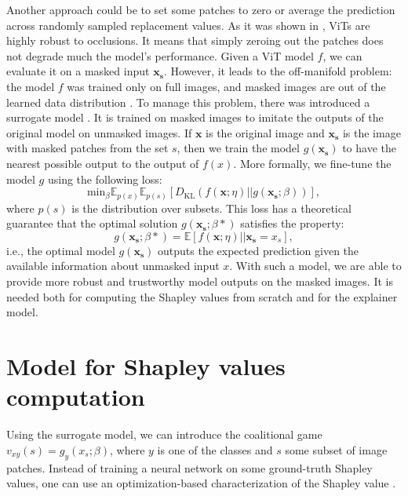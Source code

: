 \documentclass[en]{pracamgr}
\begin{document}
Another approach could be to set some patches to zero or average the prediction across randomly sampled replacement values. As it was shown in \cite{DBLP:conf/nips/NaseerRKHKY21}, ViTs are highly robust to occlusions. It means that simply zeroing out the patches does not degrade much the model's performance.  Given a ViT model $f$, we can evaluate it on a masked input $\mathbf{x_s}$. However, it leads to the off-manifold problem: the model $f$ was trained only on full images, and masked images are out of the learned data distribution \cite{DBLP:conf/aistats/TaufiqBM23}.  To manage this problem, there was introduced a surrogate model \cite{DBLP:conf/iclr/FryeMBCSF21}. It is trained on masked images to imitate the outputs of the original model on unmasked images. If $\mathbf{x}$ is the original image and $\mathbf{x_s}$ is the image with masked patches from the set $s$, then we train the model $g(\mathbf{x_s})$ to have the nearest possible output to the output of $f(x)$. More formally, we fine-tune the model $g$ using the following loss:
\begin{equation*}
    \textrm{min}_{\beta} \mathbb{E}_{p(x)} \mathbb{E}_{p(s)} \left[D_{\textrm{KL}} \left(f(\mathbf{x};\eta) || g(\mathbf{x_s};\beta)\right)\right],
\end{equation*}
where $p(s)$ is the distribution over subsets. This loss has a theoretical guarantee that the optimal solution $g(\mathbf{x_s};\beta*)$ satisfies the property:
\begin{equation*}
    g(\mathbf{x_s};\beta*) = \mathbb{E}\left[f(\mathbf{x};\eta) || \mathbf{x_s}=x_s \right],
\end{equation*}
i.e., the optimal model $g(\mathbf{x_s})$ outputs the expected prediction given the available information about unmasked input $x$. With such a model, we are able to provide more robust and trustworthy model outputs on the masked images. It is needed both for computing the Shapley values from scratch and for the explainer model.

\section{Model for Shapley values computation}\label{s:explainer_model}
Using the surrogate model, we can introduce the coalitional game $v_{xy}(s) = g_y(x_s;\beta)$, where $y$ is one of the classes and $s$ some subset of image patches. Instead of training a neural network on some ground-truth Shapley values, one can use an optimization-based characterization of the Shapley value  \cite{Characterization}.
\end{document}
